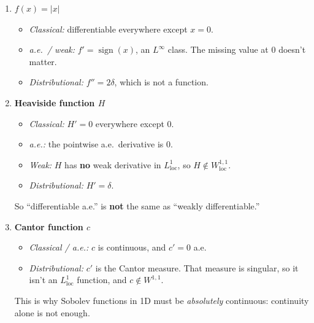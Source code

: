 \documentclass[11pt]{article}
\newcommand{\Lloc}{L^1_{\mathrm{loc}}}
\begin{document}
\begin{enumerate}
  \item \textbf{$f(x)=|x|$}
    \begin{itemize}
      \item \emph{Classical:} differentiable everywhere except $x=0$.
      \item \emph{a.e.\ / weak:} $f'=\operatorname{sign}(x)$, an $L^\infty$
        class. The missing value at $0$ doesn't matter.
      \item \emph{Distributional:} $f''=2\delta$, which is not a function.
    \end{itemize}

  \item \textbf{Heaviside function $H$}
    \begin{itemize}
      \item \emph{Classical:} $H'=0$ everywhere except $0$.
      \item \emph{a.e.:} the pointwise a.e.\ derivative is $0$.
      \item \emph{Weak:} $H$ has \textbf{no} weak derivative in $\Lloc$, so
        $H\notin W^{1,1}_{\mathrm{loc}}$.
      \item \emph{Distributional:} $H'=\delta$.
    \end{itemize}
    So ``differentiable a.e.'' is \textbf{not} the same as ``weakly
    differentiable.''

  \item \textbf{Cantor function $c$}
    \begin{itemize}
      \item \emph{Classical / a.e.:} $c$ is continuous, and $c'=0$ a.e.
      \item \emph{Distributional:} $c'$ is the Cantor measure. That measure is
        singular, so it isn't an $\Lloc$ function, and $c\notin W^{1,1}$.
    \end{itemize}
    This is why Sobolev functions in 1D must be \emph{absolutely} continuous:
    continuity alone is not enough.
\end{enumerate}
\end{document}
